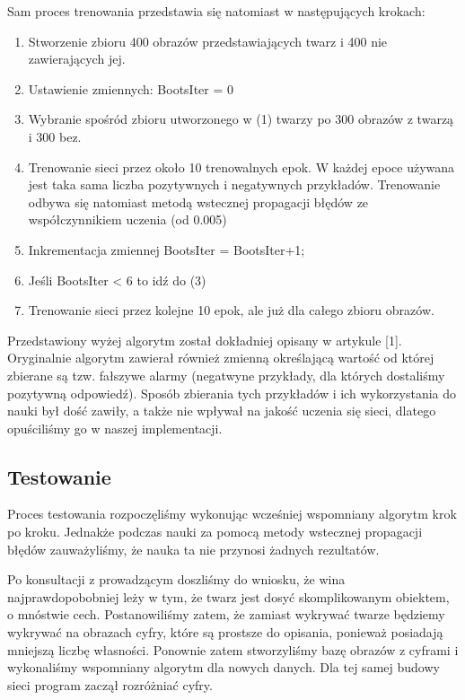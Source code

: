 \documentclass[11pt,a4paper]{article}
\begin{document}
Sam proces trenowania przedstawia się natomiast w następujących krokach:
 \begin{enumerate}
\item Stworzenie zbioru 400 obrazów przedstawiających twarz i 400 nie zawierających jej.
\item Ustawienie zmiennych: BootsIter = 0
\item Wybranie spośród zbioru utworzonego w (1) twarzy po 300 obrazów z twarzą i 300 bez.
\item Trenowanie sieci przez około 10 trenowalnych epok. W każdej epoce używana jest taka sama 
liczba pozytywnych i negatywnych przykładów. Trenowanie odbywa się natomiast metodą wstecznej 
propagacji błędów ze współczynnikiem uczenia (od 0.005)
\item Inkrementacja zmiennej BootsIter = BootsIter+1;
\item Jeśli BootsIter < 6 to idź do (3)
\item Trenowanie sieci przez kolejne 10 epok, ale już dla całego zbioru obrazów.
 \end{enumerate}

Przedstawiony wyżej algorytm został dokładniej opisany w artykule [1]. 
Oryginalnie algorytm zawierał również zmienną określającą wartość od której zbierane są tzw. 
fałszywe alarmy (negatwyne przykłady, dla których dostaliśmy pozytywną odpowiedź). Sposób zbierania 
tych przykładów i ich wykorzystania do nauki był dość zawiły, a także nie wpływał na jakość uczenia
się sieci, dlatego opuściliśmy go w naszej implementacji.

\subsection{Testowanie}

Proces testowania rozpoczęliśmy wykonując wcześniej wspomniany algorytm krok po kroku. Jednakże 
podczas nauki za pomocą metody wstecznej propagacji błędów zauważyliśmy, że nauka ta nie przynosi 
żadnych rezultatów.

Po konsultacji z prowadzącym doszliśmy do wniosku, że wina najprawdopobobniej leży w tym, że twarz 
jest dosyć skomplikowanym obiektem, o mnóstwie cech. Postanowiliśmy zatem, że zamiast wykrywać 
twarze będziemy wykrywać na obrazach cyfry, które są prostsze do opisania, ponieważ posiadają 
mniejszą liczbę własności. Ponownie zatem stworzyliśmy bazę obrazów z cyframi i wykonaliśmy 
wspomniany algorytm dla nowych danych. Dla tej samej budowy sieci program zaczął rozróżniać cyfry.
\end{document}
